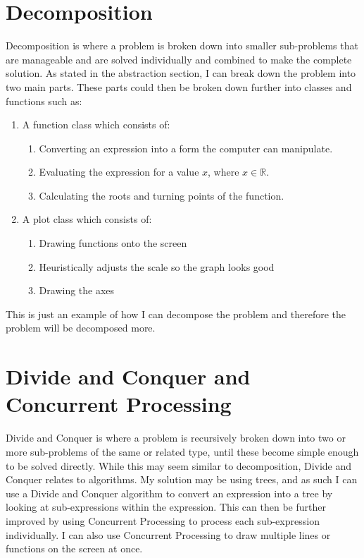 \documentclass[../../../main.tex]{subfiles}
\begin{document}
\section{Decomposition}
Decomposition is where a problem is broken down into smaller sub-problems that are manageable and are solved individually and combined to make the complete solution. As stated in the abstraction section, I can break down the problem into two main parts. These parts could then be broken down further into classes and functions such as:
\begin{enumerate}
	\item A function class which consists of:
		\begin{enumerate}
			\item Converting an expression into a form the computer can manipulate.
			\item Evaluating the expression for a value $x$, where $x\in\mathbb{R}$.
			\item Calculating the roots and turning points of the function.
		\end{enumerate}
	\item A plot class which consists of:
		\begin{enumerate}
			\item Drawing functions onto the screen
			\item Heuristically adjusts the scale so the graph looks good
			\item Drawing the axes
		\end{enumerate}
\end{enumerate}
This is just an example of how I can decompose the problem and therefore the problem will be decomposed more.
\section{Divide and Conquer and Concurrent Processing}
Divide and Conquer is where a problem is recursively broken down into two or more sub-problems of the same or related type, until these become simple enough to be solved directly. While this may seem similar to decomposition, Divide and Conquer relates to algorithms. My solution may be using trees, and as such I can use a Divide and Conquer algorithm to convert an expression into a tree by looking at sub-expressions within the expression. This can then be further improved by using Concurrent Processing to process each sub-expression individually. I can also use Concurrent Processing to draw multiple lines or functions on the screen at once.
\end{document}
